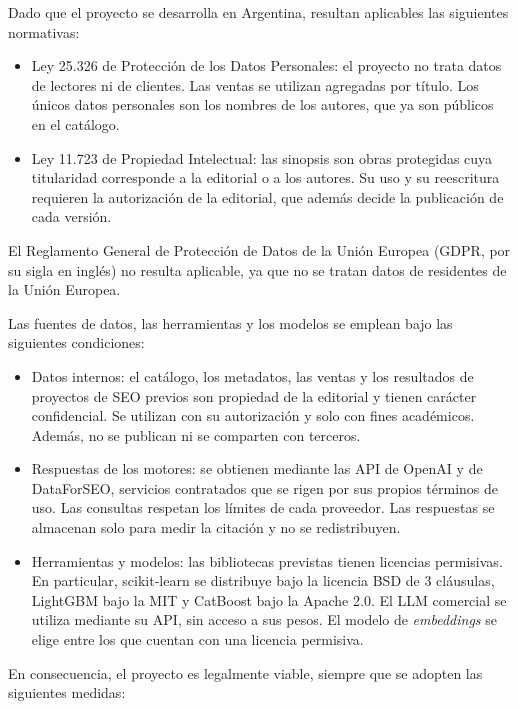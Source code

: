 \documentclass[
11pt, %
codirector, %
]{charter}
\begin{document}
Dado que el proyecto se desarrolla en Argentina, resultan aplicables las siguientes normativas:

\begin{itemize}
	\item Ley 25.326 de Protección de los Datos Personales: el proyecto no trata datos de lectores ni de clientes. Las ventas se utilizan agregadas por título. Los únicos datos personales son los nombres de los autores, que ya son públicos en el catálogo.
	\item Ley 11.723 de Propiedad Intelectual: las sinopsis son obras protegidas cuya titularidad corresponde a la editorial o a los autores. Su uso y su reescritura requieren la autorización de la editorial, que además decide la publicación de cada versión.
\end{itemize}

El Reglamento General de Protección de Datos de la Unión Europea (GDPR, por su sigla en inglés) no resulta aplicable, ya que no se tratan datos de residentes de la Unión Europea.

Las fuentes de datos, las herramientas y los modelos se emplean bajo las siguientes condiciones:

\begin{itemize}
	\item Datos internos: el catálogo, los metadatos, las ventas y los resultados de proyectos de SEO previos son propiedad de la editorial y tienen carácter confidencial. Se utilizan con su autorización y solo con fines académicos. Además, no se publican ni se comparten con terceros.
	\item Respuestas de los motores: se obtienen mediante las API de OpenAI y de DataForSEO, servicios contratados que se rigen por sus propios términos de uso. Las consultas respetan los límites de cada proveedor. Las respuestas se almacenan solo para medir la citación y no se redistribuyen.
	\item Herramientas y modelos: las bibliotecas previstas tienen licencias permisivas. En particular, scikit-learn se distribuye bajo la licencia BSD de 3 cláusulas, LightGBM bajo la MIT y CatBoost bajo la Apache 2.0. El LLM comercial se utiliza mediante su API, sin acceso a sus pesos. El modelo de \textit{embeddings} se elige entre los que cuentan con una licencia permisiva.
\end{itemize}

En consecuencia, el proyecto es legalmente viable, siempre que se adopten las siguientes medidas:
\end{document}
